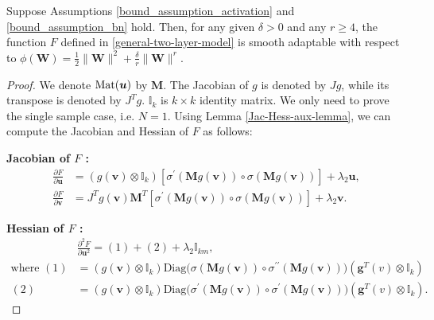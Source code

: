 \documentclass[twoside,11pt]{article}
\newcommand{\be}{\begin{equation}}
\newcommand{\ee}{\end{equation}}
\def\Mat{{\rm Mat}}
\def\vg{{\bm{g}}}
\def\vu{{\bm{u}}}
\def\vv{{\bm{v}}}
\def\mM{{\bm{M}}}
\def\mW{{\bm{W}}}
\begin{document}
\begin{proposition}
Suppose Assumptions \ref{bound_assumption_activation} and \ref{bound_assumption_bn} hold. Then, for any given $\delta>0$ and any $r\geq4$, the function $F$ defined in \eqref{general-two-layer-model} is smooth adaptable with respect to $\phi(\mW)=\frac{1}{2}\|\mW\|^2+\frac{\delta}{r}\|\mW\|^r$.
\label{DNN-kernel-degree-prop}
\end{proposition}
\begin{proof}
We denote $\Mat(\vu)$ by $\mM$. The Jacobian of $g$ is denoted by $Jg$, while its transpose is denoted by $J^Tg$. $\mathbb{I}_k$ is $k\times k$ identity matrix. We only need to prove the single sample case, i.e. $N=1$. Using Lemma \ref{Jac-Hess-aux-lemma}, we can compute the Jacobian and Hessian of $F$ as follows:

{\noindent\bf Jacobian of $F$ :}\\
\be 
\begin{aligned}
\frac{\partial F}{\partial\vu}&=\left(g(\vv)\otimes\mathbb I_k\right)\left[\sigma^\prime(\mM g(\vv))\circ\sigma(\mM g(\vv))\right]+\lambda_2\vu,\\
\frac{\partial F}{\partial\vv}&=J^Tg(\vv)\mM^T\left[\sigma^\prime(\mM g(\vv))\circ\sigma(\mM g(\vv))\right]+\lambda_2\vv.
\end{aligned}
\label{Jacobian_F}
\ee 

{\noindent\bf Hessian of $F$ :}\\
\be 
\begin{aligned}
&\frac{\partial^2F}{\partial\vu^2}=(1)+(2)+\lambda_2\mathbb{I}_{km},\\
\text{where }(1)&=\left(g(\vv)\otimes\mathbb I_k\right)\text{Diag}\big(\sigma(\mM g(\vv))\circ\sigma^{\prime\prime}(\mM g(\vv))\big)(\vg^T(v)\otimes\mathbb I_k)\\
(2)&=\left(g(\vv)\otimes\mathbb I_k\right)\text{Diag}\big(\sigma^\prime(\mM g(\vv))\circ\sigma^{\prime}(\mM g(\vv))\big)(\vg^T(v)\otimes\mathbb I_k).
\end{aligned}
\label{Hessian_Fuu}
\ee 


\end{proof}
\end{document}
